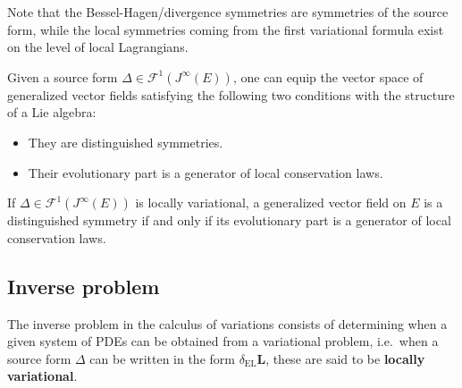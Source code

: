     \begin{remark}
        Note that the Bessel-Hagen/divergence symmetries are symmetries of the source form, while the local symmetries coming from the first variational formula exist on the level of local Lagrangians.
    \end{remark}

    \begin{property}
        Given a source form $\Delta\in\mathcal{F}^1(J^\infty(E))$, one can equip the vector space of generalized vector fields satisfying the following two conditions with the structure of a Lie algebra:
        \begin{itemize}
            \item They are distinguished symmetries.
            \item Their evolutionary part is a generator of local conservation laws.
        \end{itemize}
    \end{property}
    \begin{theorem}[Noether]
        If $\Delta\in\mathcal{F}^1(J^\infty(E))$ is locally variational, a generalized vector field on $E$ is a distinguished symmetry if and only if its evolutionary part is a generator of local conservation laws.
    \end{theorem}

\subsection{Inverse problem}\label{section:inverse_problem}

    The inverse problem in the calculus of variations consists of determining when a given system of PDEs can be obtained from a variational problem, i.e.~when a source form $\Delta$ can be written in the form $\delta_\mathrm{EL}\mathbf{L}$, these are said to be \textbf{locally variational}.

